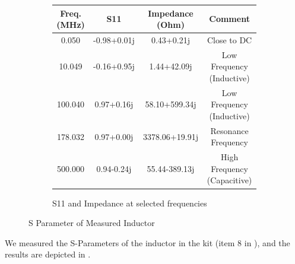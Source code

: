 \documentclass{article}
\begin{document}
\begin{figure}[h]
    \begin{subfigure}{\linewidth}
        \centering
        \begin{tabular}{ |c|c|c| c|}
            \hline
            Freq. (MHz) & S11         & Impedance (Ohm) & Comment
            \\\hline
            0.050       & -0.98+0.01j & 0.43+0.21j      & Close to DC
            \\\hline
            10.049      & -0.16+0.95j & 1.44+42.09j     & Low Frequency (Inductive)
            \\\hline
            100.040     & 0.97+0.16j  & 58.10+599.34j   & Low Frequency (Inductive)
            \\\hline
            178.032     & 0.97+0.00j  & 3378.06+19.91j  & Resonance Frequency
            \\\hline
            500.000     & 0.94-0.24j  & 55.44-389.13j   & High Frequency (Capacitive)
            \\\hline
        \end{tabular}
        \caption{S11 and Impedance at selected frequencies}
        \label{tab:inductor_meas}
    \end{subfigure}

    \caption{S Parameter of Measured Inductor}
    \label{fig:inductor_meas}
\end{figure}

We measured the S-Parameters of the inductor in the kit (item 8 in ), and the results are depicted in .
\end{document}

